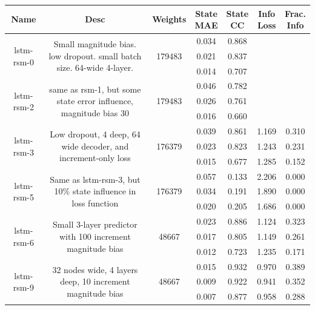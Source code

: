\begin{table}[H]
\begin{sideways}
    \begin{tabular}{c|c|c|c|c|c|c }
    \small
Name & Desc & Weights & \thead{State\\MAE} & \thead{State\\CC} & \thead{Info\\Loss} &\thead{Frac.\\Info}\\
\hline
\multirow{3}{6em}{lstm-rsm-0} & \multirow{3}{16em}{Small magnitude bias. low dropout. small batch size. 64-wide 4-layer.} & \multirow{3}{4em}{179483} & 0.034 & 0.868 &  &  \\ & & & 0.021 & 0.837 &  &  \\ & & & 0.014 & 0.707 &  &  \\
\hline
\multirow{3}{6em}{lstm-rsm-2} & \multirow{3}{16em}{same as rsm-1, but some state error influence, magnitude bias 30} & \multirow{3}{4em}{179483} & 0.046 & 0.782 &  &  \\ & & & 0.026 & 0.761 &  &  \\ & & & 0.016 & 0.660 &  &  \\
\hline
\multirow{3}{6em}{lstm-rsm-3} & \multirow{3}{16em}{Low dropout, 4 deep, 64 wide decoder, and increment-only loss} & \multirow{3}{4em}{176379} & 0.039 & 0.861 & 1.169 & 0.310 \\ & & & 0.023 & 0.823 & 1.243 & 0.231 \\ & & & 0.015 & 0.677 & 1.285 & 0.152 \\
\hline
\multirow{3}{6em}{lstm-rsm-5} & \multirow{3}{16em}{Same as lstm-rsm-3, but 10\% state influence in loss function} & \multirow{3}{4em}{176379} & 0.057 & 0.133 & 2.206 & 0.000 \\ & & & 0.034 & 0.191 & 1.890 & 0.000 \\ & & & 0.020 & 0.205 & 1.686 & 0.000 \\
\hline
\multirow{3}{6em}{lstm-rsm-6} & \multirow{3}{16em}{Small 3-layer predictor with 100 increment magnitude bias} & \multirow{3}{4em}{48667} & 0.023 & 0.886 & 1.124 & 0.323 \\ & & & 0.017 & 0.805 & 1.149 & 0.261 \\ & & & 0.012 & 0.723 & 1.235 & 0.171 \\
\hline
\multirow{3}{6em}{lstm-rsm-9} & \multirow{3}{16em}{32 nodes wide, 4 layers deep, 10 increment magnitude bias} & \multirow{3}{4em}{48667} & 0.015 & 0.932 & 0.970 & 0.389 \\ & & & 0.009 & 0.922 & 0.941 & 0.352 \\ & & & 0.007 & 0.877 & 0.958 & 0.288 \\

\end{tabular}
\end{sideways}
\end{table}
